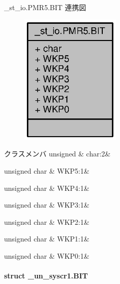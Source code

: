 \+\_\+st\+\_\+io.\+P\+M\+R5.\+B\+I\+T 連携図
\nopagebreak
\begin{figure}[H]
\begin{center}
\leavevmode
\includegraphics[width=136pt]{d9/d66/struct__st__io_8PMR5_8BIT__coll__graph}
\end{center}
\end{figure}
\begin{DoxyFields}{クラスメンバ}
unsigned\label{3694s_8h_aa87deb01c5f539e6bda34829c8ef2368}
&
char\+:2&
\\
\hline

unsigned char\label{3694s_8h_a2e57943d4a4cc4a6d1b61712c069b4b6}
&
W\+K\+P5\+:1&
\\
\hline

unsigned char\label{3694s_8h_a3e7ba616906a0a64a406a7bf6e1e3517}
&
W\+K\+P4\+:1&
\\
\hline

unsigned char\label{3694s_8h_a3e3c18f6ebb7b905b4fb151709019479}
&
W\+K\+P3\+:1&
\\
\hline

unsigned char\label{3694s_8h_a600a24cead5fb26a98a7d270870956e5}
&
W\+K\+P2\+:1&
\\
\hline

unsigned char\label{3694s_8h_a47ffb78f5f7c44cd8a84888af80c7ad2}
&
W\+K\+P1\+:1&
\\
\hline

unsigned char\label{3694s_8h_a828196f36a188e20bdbb6814cfe2f030}
&
W\+K\+P0\+:1&
\\
\hline

\end{DoxyFields}
\label{struct__un__syscr1_8BIT}
\paragraph{struct \+\_\+un\+\_\+syscr1.\+B\+I\+T}


